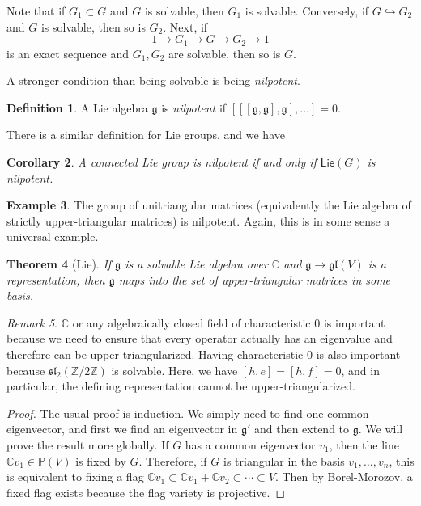 \documentclass[leqno, openany]{memoir}
\newtheorem{thm}{Theorem}[section]
\newtheorem{cor}[thm]{Corollary}
\theoremstyle{definition}
\newtheorem{defn}[thm]{Definition}
\newtheorem{exm}[thm]{Example}
\theoremstyle{remark}
\newtheorem{rmk}[thm]{Remark}
\theoremstyle{plain}
\theoremstyle{definition}
\theoremstyle{remark}
\newcommand{\C}{\mathbb{C}}
\newcommand{\Z}{\mathbb{Z}}
\renewcommand{\P}{\mathbb{P}}
\newcommand{\mf}[1]{\mathfrak{#1}}
\newcommand{\ms}[1]{\mathsf{#1}}
\begin{document}
Note that if $G_1 \subset G$ and $G$ is solvable, then $G_1$ is solvable. Conversely, if $G \hookrightarrow G_2$ and $G$ is solvable, then so is $G_2$. Next, if
\[ 1 \to G_1 \to G \to G_2 \to 1 \]
is an exact sequence and $G_1, G_2$ are solvable, then so is $G$.

A stronger condition than being solvable is being \textit{nilpotent}.

\begin{defn}
    A Lie algebra $\mf{g}$ is \textit{nilpotent} if $[[[\mf{g}, \mf{g}], \mf{g}], \ldots] = 0$.
\end{defn}

There is a similar definition for Lie groups, and we have

\begin{cor}
    A connected Lie group is \textit{nilpotent} if and only if $\ms{Lie}(G)$ is nilpotent. 
\end{cor}

\begin{exm}
    The group of unitriangular matrices (equivalently the Lie algebra of strictly upper-triangular matrices) is nilpotent. Again, this is in some sense a universal example.
\end{exm}

\begin{thm}[Lie]
    If $\mf{g}$ is a solvable Lie algebra over $\C$ and $\mf{g} \to \mf{gl}(V)$ is a representation, then $\mf{g}$ maps into the set of upper-triangular matrices in some basis.
\end{thm}

\begin{rmk}
    $\C$ or any algebraically closed field of characteristic $0$ is important because we need to ensure that every operator actually has an eigenvalue and therefore can be upper-triangularized. Having characteristic $0$ is also important because $\mf{sl}_2(\Z/2\Z)$ is solvable. Here, we have $[h,e] = [h,f] = 0$, and in particular, the defining representation cannot be upper-triangularized.
\end{rmk}

\begin{proof}
    The usual proof is induction. We simply need to find one common eigenvector, and first we find an eigenvector in $\mf{g}'$ and then extend to $\mf{g}$. We will prove the result more globally. If $G$ has a common eigenvector $v_1$, then the line $\C v_1 \in \P(V)$ is fixed by $G$. Therefore, if $G$ is triangular in the basis $v_1, \ldots, v_n$, this is equivalent to fixing a flag $\C v_1 \subset \C v_1 + \C v_2 \subset \cdots \subset V$. Then by Borel-Morozov, a fixed flag exists because the flag variety is projective.
\end{proof}
\end{document}
